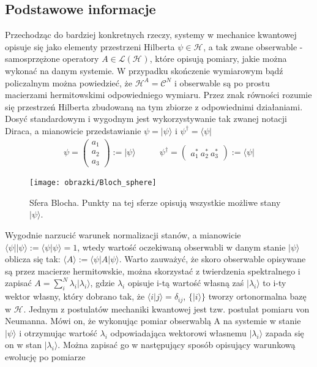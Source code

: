 \documentclass[10pt]{article} %
\newcommand{\Mats}[1]{\mathcal{L}(#1)}
\newcommand{\Hx}[1]{\mathcal{H}^{#1}}
\newcommand{\LHx}[1]{\Mats{\Hx{#1}}}
\newcommand{\Ket}[1]{|#1\rangle}
\newcommand{\Bra}[1]{\langle#1|}
\newcommand{\Braket}[1]{\langle#1\rangle}
\newcommand{\KP}{\Ket{\psi}}
\begin{document}
\subsection{Podstawowe informacje}
Przechodząc do bardziej konkretnych rzeczy, systemy w mechanice kwantowej opisuje się jako elementy przestrzeni Hilberta $\psi \in \Hx{}$, a tak zwane obserwable - samosprzężone operatory $A \in \LHx{}$, które opisują pomiary, jakie można wykonać na danym systemie. W przypadku skończenie wymiarowym bądź policzalnym można powiedzieć, że $\Hx{A} = \mathcal{C}^N$ i
obserwable są po prostu macierzami hermitowskimi odpowiedniego wymiaru. Przez znak równości rozumie się przestrzeń Hilberta zbudowaną na tym zbiorze z odpowiednimi działaniami. Dosyć standardowym i wygodnym jest wykorzystywanie tak zwanej notacji Diraca, a mianowicie przedstawianie $\psi = \Ket{\psi}$ i $\psi^\dag = \Bra{\psi}$
\begin{align}
\psi = 
\begin{pmatrix}
a_1\\a_2\\a_3
\end{pmatrix}
:= \Ket{\psi}
\quad & \quad\psi^\dag = 
\begin{pmatrix}
a_1^*~a_2^*~a_3^*
\end{pmatrix}
:= \Bra{\psi}
\end{align}
\begin{figure}[th]
\centering
\texttt{[image: obrazki/Bloch\_sphere]}
\caption{Sfera Blocha. Punkty na tej sferze opisują wszystkie możliwe stany $\KP$.}
\label{fig:bloch}
\end{figure}
Wygodnie narzucić warunek normalizacji stanów, a mianowicie $\Bra{\psi}\Ket{\psi} := \Braket{\psi|\psi} = 1$, wtedy wartość oczekiwaną obserwabli w danym stanie $\Ket{\psi}$ oblicza się tak: $\Braket{A} := \Bra{\psi}A\Ket{\psi}$. Warto zauważyć, że skoro obserwable opisywane są przez macierze hermitowskie, można 
skorzystać z twierdzenia spektralnego i zapisać $A = \sum_i^N \lambda_i \Ket{\lambda_i}$, gdzie $\lambda_i$ opisuje i-tą wartość własną zaś $\Ket{\lambda_i}$ to i-ty wektor własny, który dobrano tak, że $\Braket{i|j} = \delta_{ij}$, $\{\Ket{i}\}$ tworzy ortonormalna bazę w $\Hx{}$. Jednym z postulatów mechaniki kwantowej jest tzw. postulat pomiaru von Neumanna. Mówi on, że wykonując pomiar obserwablą A na systemie w stanie $\Ket{\psi}$ i otrzymując wartość $\lambda_i$ odpowiadająca wektorowi własnemu $\Ket{\lambda_i}$ zapada się on w stan $\Ket{\lambda_i}$. Można zapisać go w następujący sposób opisujący warunkową ewolucję po pomiarze
\end{document}
